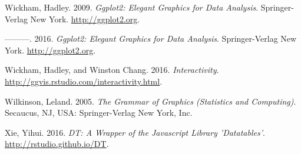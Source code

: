 \documentclass[11pt,]{report}
\begin{document}
\hypertarget{ref-ggplot01}{}
Wickham, Hadley. 2009. \emph{Ggplot2: Elegant Graphics for Data
Analysis}. Springer-Verlag New York. \url{http://ggplot2.org}.

\hypertarget{ref-wickham01}{}
---------. 2016. \emph{Ggplot2: Elegant Graphics for Data Analysis}.
Springer-Verlag New York. \url{http://ggplot2.org}.

\hypertarget{ref-ggvis02}{}
Wickham, Hadley, and Winston Chang. 2016. \emph{Interactivity}.
\url{http://ggvis.rstudio.com/interactivity.html}.

\hypertarget{ref-wilkin01}{}
Wilkinson, Leland. 2005. \emph{The Grammar of Graphics (Statistics and
Computing)}. Secaucus, NJ, USA: Springer-Verlag New York, Inc.

\hypertarget{ref-dt01}{}
Xie, Yihui. 2016. \emph{DT: A Wrapper of the Javascript Library
'Datatables'}. \url{http://rstudio.github.io/DT}.
\end{document}
